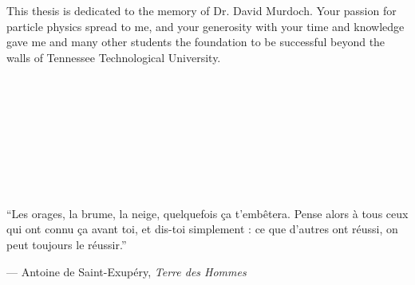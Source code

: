 \begin{vplace}
\noindent
This thesis is dedicated to the memory of Dr. David Murdoch.
Your passion for particle physics spread to me, and your 
generosity with your time and knowledge gave me and many
other students the foundation to be successful beyond the
walls of Tennessee Technological University.
\\
\\
\\
\\
\\
\\
\\
\\
\\
\\
  ``Les orages, la brume, la neige, quelquefois {\c c}a t'emb{\^e}tera. 
Pense alors {\`a} tous ceux qui ont connu {\c c}a avant toi, 
et dis-toi simplement : ce que d'autres ont r{\'e}ussi, 
on peut toujours le r{\'e}ussir.''

--- Antoine de Saint-Exup{\'e}ry, \emph{Terre des Hommes}
\end{vplace}
